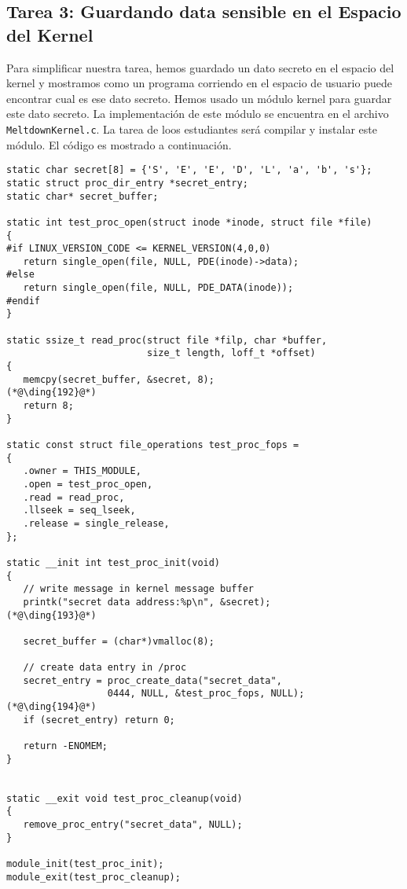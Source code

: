 \subsection{Tarea 3: Guardando data sensible en el Espacio del Kernel}

Para simplificar nuestra tarea, hemos guardado un dato secreto en el espacio del kernel y mostramos como un programa corriendo en el espacio de usuario puede encontrar cual es ese dato secreto. Hemos usado un módulo kernel para guardar este dato secreto. La implementación de este módulo se encuentra en el archivo \texttt{MeltdownKernel.c}. 
La tarea de loos estudiantes será compilar y instalar este módulo. El código es mostrado a continuación.

\begin{lstlisting}[caption=\texttt{MeltdownKernel.c}, label=meltdown:list:kernelmodule]
static char secret[8] = {'S', 'E', 'E', 'D', 'L', 'a', 'b', 's'};
static struct proc_dir_entry *secret_entry;
static char* secret_buffer;

static int test_proc_open(struct inode *inode, struct file *file)
{
#if LINUX_VERSION_CODE <= KERNEL_VERSION(4,0,0)
   return single_open(file, NULL, PDE(inode)->data);
#else
   return single_open(file, NULL, PDE_DATA(inode));
#endif
}

static ssize_t read_proc(struct file *filp, char *buffer, 
                         size_t length, loff_t *offset)
{
   memcpy(secret_buffer, &secret, 8);                  (*@\ding{192}@*)
   return 8;
}

static const struct file_operations test_proc_fops =
{
   .owner = THIS_MODULE,
   .open = test_proc_open,
   .read = read_proc,
   .llseek = seq_lseek,
   .release = single_release,
};

static __init int test_proc_init(void)
{
   // write message in kernel message buffer
   printk("secret data address:%p\n", &secret);        (*@\ding{193}@*)

   secret_buffer = (char*)vmalloc(8);

   // create data entry in /proc
   secret_entry = proc_create_data("secret_data", 
                  0444, NULL, &test_proc_fops, NULL);  (*@\ding{194}@*)
   if (secret_entry) return 0;

   return -ENOMEM;
}


static __exit void test_proc_cleanup(void)
{
   remove_proc_entry("secret_data", NULL);
}

module_init(test_proc_init);
module_exit(test_proc_cleanup);
\end{lstlisting}

